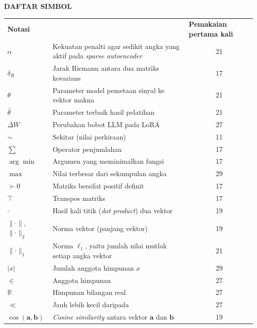 \cleardoublepage
\vspace{2cm}
\begin{center}
{\fontsize{14}{16.8}\selectfont\textbf{DAFTAR SIMBOL}}\\[1em]
\end{center}
\label{chap:simbol}
\setcounter{chapter}{0}
\setcounter{section}{0}
\vspace{2em}




\begin{longtable}{@{} l >{\raggedright\arraybackslash}p{6.5cm} c @{}}
\multicolumn{1}{l}{\textbf{Notasi}} & \multicolumn{1}{l}{\textbf{Deskripsi}} & \multicolumn{1}{l}{\parbox[c]{3.5cm}{\raggedright \textbf{Pemakaian pertama kali}}} \\


$\alpha$ & Kekuatan penalti agar sedikit angka yang aktif pada \textit{sparse autoencoder} & 21 \\
$\delta_R$ & Jarak Riemann antara dua matriks kovarians & 17 \\
$\theta$ & Parameter model pemetaan sinyal ke vektor makna & 21 \\
$\hat{\theta}$ & Parameter terbaik hasil pelatihan & 21 \\
$\Delta W$ & Perubahan bobot LLM pada LoRA & 27 \\[1ex]


$\sim$ & Sekitar (nilai perkiraan) & 11 \\
$\sum$ & Operator penjumlahan & 17 \\
$\arg\min$ & Argumen yang meminimalkan fungsi & 17 \\
$\max$ & Nilai terbesar dari sekumpulan angka & 29 \\
$\succ 0$ & Matriks bersifat positif definit & 17 \\
$\top$ & Transpos matriks & 17 \\
$\cdot$ & Hasil kali titik (\textit{dot product}) dua vektor & 19 \\
$\lVert \cdot \rVert$, $\lVert \cdot \rVert_2$ & Norma vektor (panjang vektor) & 19 \\
$\lVert \cdot \rVert_1$ & Norma $\ell_1$, yaitu jumlah nilai mutlak setiap angka vektor & 21 \\
$|x|$ & Jumlah anggota himpunan $x$ & 29 \\
$\in$ & Anggota himpunan & 27 \\
$\mathbb{R}$ & Himpunan bilangan real & 27 \\
$\ll$ & Jauh lebih kecil daripada & 27 \\
$\cos(\mathbf{a}, \mathbf{b})$ & \textit{Cosine similarity} antara vektor $\mathbf{a}$ dan $\mathbf{b}$ & 19 \\[1ex]


\end{longtable}

